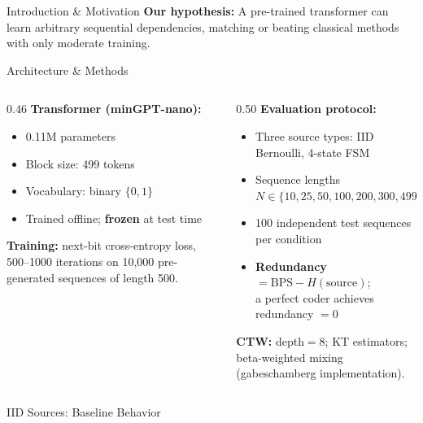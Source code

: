 \documentclass[final]{beamer}
\newlength{\leftcolwid}
\begin{document}
\begin{frame}[t]
\begin{columns}[t]
\begin{column}{\leftcolwid}
\begin{block}{Introduction \& Motivation}
\medskip
\textbf{Our hypothesis:} A pre-trained transformer can learn arbitrary sequential
dependencies, matching or beating classical methods with only moderate training.

\end{block}

\begin{block}{Architecture \& Methods}

\begin{columns}[t]
  \begin{column}{0.46\linewidth}
    \textbf{Transformer (minGPT-nano):}
    \begin{itemize}
      \item 0.11M parameters
      \item Block size: 499 tokens
      \item Vocabulary: binary $\{0,1\}$
      \item Trained offline; \textbf{frozen} at test time
    \end{itemize}

    \medskip
    \textbf{Training:} next-bit cross-entropy loss,
    500--1000 iterations on 10{,}000 pre-generated
    sequences of length 500.
  \end{column}
  \begin{column}{0.50\linewidth}
    \textbf{Evaluation protocol:}
    \begin{itemize}
      \item Three source types: IID Bernoulli, 4-state FSM
      \item Sequence lengths $N \in \{10,25,50,100,200,300,499\}$
      \item 100 independent test sequences per condition
      \item \textbf{Redundancy} $= \text{BPS} - H(\text{source})$;\\
            a perfect coder achieves redundancy $= 0$
    \end{itemize}

    \medskip
    \textbf{CTW:} depth$=8$; KT estimators; beta-weighted
    mixing (gabeschamberg implementation).
  \end{column}
\end{columns}

\end{block}

\begin{block}{IID Sources: Baseline Behavior}


\end{block}
\end{column}
\end{columns}
\end{frame}
\end{document}
